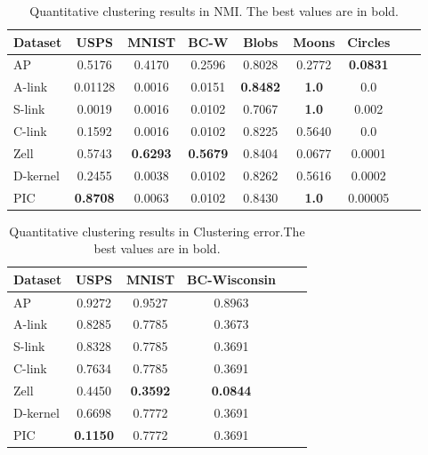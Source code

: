 \documentclass[
	10pt,
	parskip=half-,	
	paper=a4,
	english
	]{scrartcl}
\begin{document}
\begin{table}[h]
    \centering
    \caption{Quantitative clustering results in NMI. The best values are in bold.}
    \begin{tabular}{lcccccccc}
    \toprule
    \textbf{Dataset} & \textbf{USPS} & \textbf{MNIST} & \textbf{BC-W} & \textbf{Blobs} & \textbf{Moons} & \textbf{Circles} \\
    \midrule
    AP       & 0.5176   & 0.4170 & 0.2596 & 0.8028  & 0.2772 & \textbf{0.0831} \\
    A-link   & 0.01128  & 0.0016 & 0.0151 & \textbf{0.8482}  & \textbf{1.0} & 0.0 \\
    S-link   & 0.0019   & 0.0016 & 0.0102 & 0.7067  & \textbf{1.0} & 0.002 \\
    C-link   & 0.1592   & 0.0016 & 0.0102 & 0.8225  & 0.5640 & 0.0 \\
    Zell     & 0.5743   & \textbf{0.6293} & \textbf{0.5679} & 0.8404   & 0.0677 & 0.0001 \\
    D-kernel & 0.2455   & 0.0038 & 0.0102 & 0.8262   & 0.5616 & 0.0002 \\
    PIC & \textbf{0.8708} & 0.0063 & 0.0102 & 0.8430   & \textbf{1.0} & 0.00005 \\
    \bottomrule
    \end{tabular}
    \label{tab:synthetic_results_nmi}
\end{table}

\begin{table}[h]
    \centering
    \caption{Quantitative clustering results in Clustering error.The best values are in bold.}
    \begin{tabular}{lccccc}
    \toprule
    \textbf{Dataset} & \textbf{USPS} & \textbf{MNIST} & \textbf{BC-Wisconsin} \\
    \midrule
    AP       & 0.9272   & 0.9527 & 0.8963\\
    A-link   & 0.8285  & 0.7785 & 0.3673  \\
    S-link   & 0.8328   & 0.7785 & 0.3691\\
    C-link   & 0.7634   & 0.7785 & 0.3691\\
    Zell     & 0.4450   & \textbf{0.3592} & \textbf{0.0844}\\
    D-kernel & 0.6698   & 0.7772 & 0.3691\\
    PIC & \textbf{0.1150} & 0.7772 & 0.3691 \\
    \bottomrule
    \end{tabular}
    \label{tab:synthetic_results_ce}
\end{table}
\end{document}
